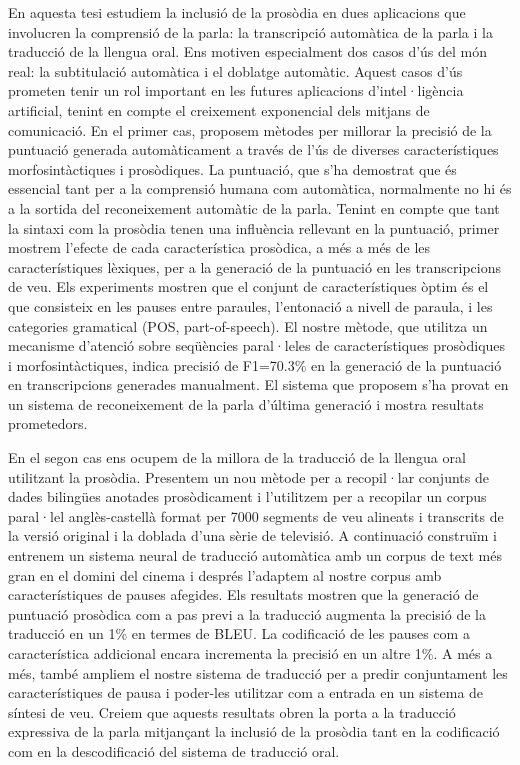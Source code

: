 En aquesta tesi estudiem la inclusió de la prosòdia en dues aplicacions que involucren la comprensió de la parla: la transcripció automàtica de la parla i la traducció de la llengua oral. Ens motiven especialment dos casos d’ús del món real: la subtitulació automàtica i el doblatge automàtic. Aquest casos d’ús prometen tenir un rol important en les futures aplicacions d’intel·ligència artificial, tenint en compte el creixement exponencial dels mitjans de comunicació. En el primer cas, proposem mètodes per millorar la precisió de la puntuació generada automàticament a través de l’ús de diverses característiques morfosintàctiques i prosòdiques. La puntuació, que s’ha demostrat que és essencial tant per a la comprensió humana com automàtica, normalmente no hi és a la sortida del reconeixement automàtic de la parla. Tenint en compte que tant la sintaxi com la prosòdia tenen una influència rellevant en la puntuació, primer mostrem l’efecte de cada característica prosòdica, a més a més de les característiques lèxiques, per a la generació de la puntuació en les transcripcions de veu. Els experiments mostren que el conjunt de característiques òptim és el que consisteix en les pauses entre paraules, l’entonació a nivell de paraula, i les categories gramatical (POS, part-of-speech). El nostre mètode, que utilitza un mecanisme d’atenció sobre seqüències paral·leles de característiques prosòdiques i morfosintàctiques, indica precisió de F1=70.3\% en la generació de la puntuació en transcripcions generades manualment. El sistema que proposem s’ha provat en un sistema de reconeixement de la parla d’última generació i mostra resultats prometedors. 

En el segon cas ens ocupem de la millora de la traducció de la llengua oral utilitzant la prosòdia. Presentem un nou mètode per a recopil·lar conjunts de dades bilingües anotades prosòdicament i l’utilitzem per a recopilar un corpus paral·lel anglès-castellà format per 7000 segments de veu alineats i transcrits de la versió original i la doblada d’una sèrie de televisió. A continuació construïm i entrenem un sistema neural de traducció automàtica amb un corpus de text més gran en el domini del cinema i després l’adaptem al nostre corpus amb característiques de pauses afegides. Els resultats mostren que la generació de puntuació prosòdica com a pas previ a la traducció augmenta la precisió de la traducció en un 1\% en termes de BLEU. La codificació de les pauses com a característica addicional encara incrementa la precisió en un altre 1\%. A més a més, també ampliem el nostre sistema de traducció per a predir conjuntament les característiques de pausa i poder-les utilitzar com a entrada en un sistema de síntesi de veu. Creiem que aquests resultats obren la porta a la traducció expressiva de la parla mitjançant la inclusió de la prosòdia tant en la codificació com en la descodificació del sistema de traducció oral.

